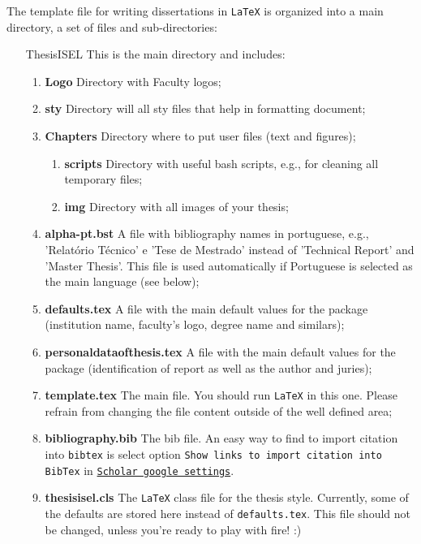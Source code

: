 The template file for writing dissertations in  \texttt{LaTeX} is organized into a main directory, a set of files and sub-directories:
\begin{enumerate}
	\item[ThesisISEL] This is the main directory and includes:
	\begin{enumerate}
		\item \textbf{Logo} Directory with Faculty logos;
		\item \textbf{sty} Directory will all sty files that help in formatting document;
		\item \textbf{Chapters} Directory where to put user files (text and figures);
		\begin{enumerate}
		\item \textbf{scripts} Directory with useful bash scripts, e.g., for cleaning all temporary files;
		\item \textbf{img} Directory with all images of your thesis;
		\end{enumerate}
		\item \textbf{alpha-pt.bst} A file with bibliography names in portuguese, e.g., 'Relatório Técnico' e 'Tese de Mestrado' instead of 'Technical Report' and 'Master Thesis'. This file is used automatically if Portuguese is selected as the main language (see below);
		\item \textbf{defaults.tex} A file with the main default values for the package (institution name, faculty's logo, degree name and similars);
		\item \textbf{personaldataofthesis.tex} A file with the main default values for the package (identification of report as well as the author and juries);
		\item \textbf{template.tex} The main file. You should run  \texttt{LaTeX} in this one. Please refrain from changing the file content outside of the well defined area;
		\item \textbf{bibliography.bib} The bib file. An easy way to find to import citation into \texttt{bibtex} is select option \texttt{Show links to import citation into
Bib\-Tex} in \href{http://scholar.google.pt/scholar_settings?hl=en&as_sdt=0,5}{\texttt{Scholar google settings}}.
		\item \textbf{thesisisel.cls} The  \texttt{LaTeX} class file for the thesis{} style. Currently, some of the defaults are stored here instead of \verb!defaults.tex!. This file should not be changed, unless you're ready to play with fire! :)
	\end{enumerate}
\end{enumerate}


